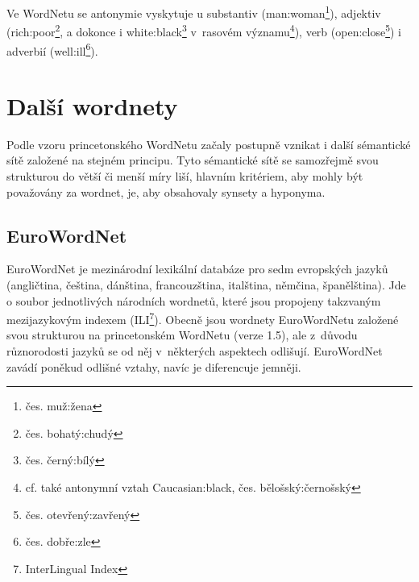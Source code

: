 \documentclass[a4paper,11pt,openany,twoside]{book}
\newcommand\ex{\textsf}
\begin{document}


					Ve WordNetu se antonymie vyskytuje u substantiv (\ex{man:woman}\footnote{čes. \ex{muž:žena}}), adjektiv (\ex{rich:poor}\footnote{čes. \ex{bohatý:chudý}}, a dokonce i \ex{white:black}\footnote{čes. \ex{černý:bílý}} v~rasovém významu\footnote{cf. také antonymní vztah \ex{Caucasian:black}, čes. \ex{bělošský:černošský}}), verb (\ex{open:close}\footnote{čes. \ex{otevřený:zavřený}}) i adverbií (\ex{well:ill}\footnote{čes. \ex{dobře:zle}}). \parencite{princetonWN}



		\chapter{Další wordnety}
		\label{cha:dalsi_wordnety}

		
			Podle vzoru princetonského WordNetu začaly postupně vznikat i další sémantické sítě založené na stejném principu. Tyto sémantické sítě se samozřejmě svou strukturou do větší či menší míry liší, hlavním kritériem, aby mohly být považovány za wordnet, je, aby obsahovaly synsety a hyponyma. \parencite{gwa2013wordnetsworld} %

			\section{EuroWordNet} %
			\label{sec:eurowordnet}
				

				EuroWordNet je mezinárodní lexikální databáze pro sedm evropských jazyků (angličtina, čeština, dánština, francouzština, italština, němčina, španělština). Jde o soubor jednotlivých národních wordnetů, které jsou propojeny takzvaným mezijazykovým indexem (ILI\footnote{InterLingual Index}). Obecně jsou wordnety EuroWordNetu založené svou strukturou na princetonském WordNetu (verze 1.5), ale z~důvodu různorodosti jazyků se od něj v~některých aspektech odlišují. EuroWordNet zavádí poněkud odlišné vztahy, navíc je diferencuje jemněji. \parencite{pazienza2008bottom}
\end{document}
